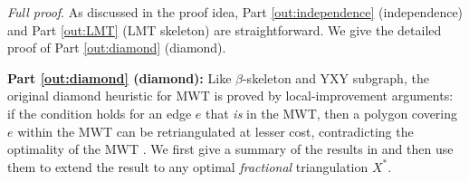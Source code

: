 \documentclass[final]{siamltex}
\newcommand{\edge}{e}
\newcommand{\fracTriang}{X}
\newenvironment{fullproof}{\par{\it Full proof}. \ignorespaces}{\endproof}
\begin{document}
\begin{fullproof}
As discussed in the proof idea, Part \ref{out:independence} (independence) 
and Part \ref{out:LMT} (LMT skeleton) are straightforward. We give the detailed proof of 
Part \ref{out:diamond} (diamond).



\bigskip
\noindent
{\bf Part \ref{out:diamond} (diamond):}
Like $\beta$-skeleton and YXY subgraph, 
the original diamond heuristic for MWT is proved by local-improvement arguments:
if the condition holds for an edge $\edge$ that {\em is} in the MWT,
then a polygon covering $\edge$ within the MWT can be retriangulated at lesser cost,
contradicting the optimality of the MWT \cite{das1989triangulations,drysdale2001exclusion}.
We first give a summary of the results in \cite{drysdale2001exclusion} 
and then use them to extend the result to any optimal {\em fractional} triangulation $\fracTriang^*$.


\end{fullproof}
\end{document}
